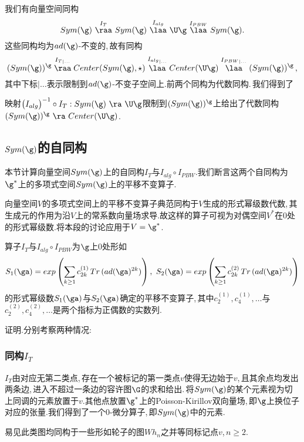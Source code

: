 我们有向量空间同构
$$Sym(\g)\,\,{\buildrel I_T\over  \raa }\,\,  Sym(\g )  \,\,{\buildrel I_{alg} \over \laa}\,\,\U\g  \,\,{\buildrel I_{PBW} \over\laa }\,\, Sym(\g).$$
这些同构均为$ad(\g)$-不变的,\,故有同构
$$ (Sym(\g))^\g\buildrel {I_T}_{|\dots} \over \raa  Center(Sym(\g),\star)\buildrel  {I_{alg}}_{|\dots}\over \laa  Center(\U\g)\buildrel {I_{PBW}}_{|\dots}\over  \laa (Sym(\g))^\g\,,$$
其中下标$|\dots$表示限制到$ad(\g)$-不变子空间上.前两个同构为代数同构.\,我们得到了

\begin{thm}
映射$\bigl(I_{alg}\bigr)^{-1}\circ I_T:Sym(\g)\,\,\ra \,\,\U\g$限制到$(Sym(\g))^\g$上给出了代数同构$(Sym(\g))^\g\,\,\ra \,\, Center(\U\g)$.
\end{thm}

\subsection{$Sym(\g)$的自同构}
本节计算向量空间$Sym(\g)$上的自同构$I_T$与$I_{alg}\circ I_{PBW}$.我们断言这两个自同构为$\g^*$上的多项式空间$Sym(\g)$上的平移不变算子.

向量空间$V$的多项式空间上的平移不变算子典范同构于$V$生成的形式幂级数代数,\,其生成元的作用为沿$V$上的常系数向量场求导.故这样的算子可视为对偶空间$V^*$在$0$处的形式幂级数.将本段的讨论应用于$V=\g^*$.

\begin{thm}
算子$I_T$与$I_{alg}\circ I_{PBW}$为$\g$上$0$处形如
$$S_1(\ga)=exp\left(\sum_{k\ge 1} c_{2k}^{(1)}\,Tr\,(ad( \ga)^{2k})\right),\,\, S_2(\ga)=exp\left(\sum_{k\ge 1}   c_{2k}^{(2)}\,Tr\,(ad( \ga)^{2k})\right)  $$
的形式幂级数$S_1(\ga)$与$S_2(\ga)$确定的平移不变算子,\,其中$c_2^{(1)},c_4^{(1)},\dots$与$c_2^{(2)},c_4^{(2)},\dots$是两个指标为正偶数的实数列.
\end{thm}

证明.分别考察两种情况:\,

\subsubsection{同构$I_T$}
$I_T$由对应无第二类点,\,存在一个被标记的第一类点$v$使得无边始于$v$,\,且其余点均发出两条边,\,进入不超过一条边的容许图$\G$的求和给出.\,将$Sym(\g)$的某个元素视为切上同调的元素放置于$v$.其他点放置$\g^*$上的Poisson-Kirillov双向量场,\,即$\g$上换位子对应的张量.我们得到了一个$0$-微分算子,\,即$Sym(\g)$中的元素.

易见此类图均同构于一些形如轮子的图$Wh_n$之并等同标记点$v$,\,$n\ge 2$.

